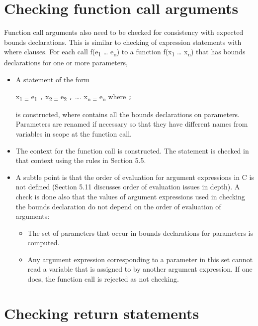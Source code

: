 \section{Checking function call arguments}\label{checking-function-call-arguments}

Function call arguments also need to be checked for consistency with
expected bounds declarations. This is similar to checking of expression
statements with where clauses. For each call f(e\textsubscript{1}
\ldots{} e\textsubscript{n}) to a function f(x\textsubscript{1} \ldots{}
x\textsubscript{n}) that has bounds declarations for one or more
parameters,

\begin{itemize}
\item
  A statement of the form

  x\textsubscript{1 =} e\textsubscript{1} \texttt{,} x\textsubscript{2
  =} e\textsubscript{2} \texttt{,} \ldots{}. x\textsubscript{n =}
  e\textsubscript{n} where  \texttt{;}

  is constructed, where  contains all the bounds
  declarations on parameters. Parameters are renamed if necessary so
  that they have different names from variables in scope at the function
  call.
\item
  The context for the function call is constructed. The statement is
  checked in that context using the rules in Section 5.5.
\item
  A subtle point is that the order of evaluation for argument
  expressions in C is not defined (Section 5.11 discusses order of
  evaluation issues in depth). A check is done also that the values of
  argument expressions used in checking the bounds declaration do not
  depend on the order of evaluation of arguments:

  \begin{itemize}
  \item
    The set of parameters that occur in bounds declarations for
    parameters is computed.
  \item
    Any argument expression corresponding to a parameter in this set
    cannot read a variable that is assigned to by another argument
    expression. If one does, the function call is rejected as not
    checking.
  \end{itemize}
\end{itemize}

 \section{Checking return statements}\label{checking-return-statements}

